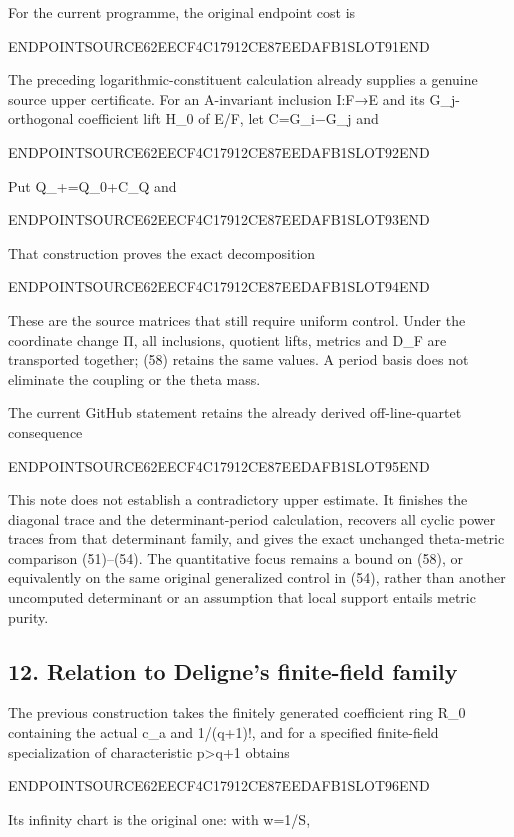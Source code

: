 For the current programme, the original endpoint cost is

ENDPOINTSOURCE62EECF4C17912CE87EEDAFB1SLOT91END

The preceding logarithmic-constituent calculation already supplies a genuine source upper certificate. For an A-invariant inclusion I:F→E and its G\_j-orthogonal coefficient lift H\_0 of E/F, let C=G\_i−G\_j and

ENDPOINTSOURCE62EECF4C17912CE87EEDAFB1SLOT92END

Put Q\_+=Q\_0+C\_Q and

ENDPOINTSOURCE62EECF4C17912CE87EEDAFB1SLOT93END

That construction proves the exact decomposition

ENDPOINTSOURCE62EECF4C17912CE87EEDAFB1SLOT94END

These are the source matrices that still require uniform control. Under the coordinate change Π, all inclusions, quotient lifts, metrics and D\_F are transported together; (58) retains the same values. A period basis does not eliminate the coupling or the theta mass.

The current GitHub statement retains the already derived off-line-quartet consequence

ENDPOINTSOURCE62EECF4C17912CE87EEDAFB1SLOT95END

This note does not establish a contradictory upper estimate. It finishes the diagonal trace and the determinant-period calculation, recovers all cyclic power traces from that determinant family, and gives the exact unchanged theta-metric comparison (51)--(54). The quantitative focus remains a bound on (58), or equivalently on the same original generalized control in (54), rather than another uncomputed determinant or an assumption that local support entails metric purity.

\subsection{12. Relation to Deligne's finite-field family}\label{endpoint-sga_trace_period--relation-to-delignes-finite-field-family}

The previous construction takes the finitely generated coefficient ring R\_0 containing the actual c\_a and 1/(q+1)!, and for a specified finite-field specialization of characteristic p\textgreater q+1 obtains

ENDPOINTSOURCE62EECF4C17912CE87EEDAFB1SLOT96END

Its infinity chart is the original one: with w=1/S,

